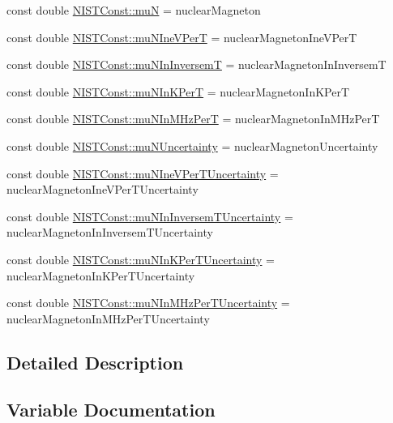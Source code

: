 \begin{DoxyCompactItemize}
\item 
const double \hyperlink{group___nuclear_magneton_ga5b19bcb311479cc6f5c36b551356e580}{N\+I\+S\+T\+Const\+::muN} = nuclear\+Magneton
\item 
const double \hyperlink{group___nuclear_magneton_ga2c8a56a6542df06b37fed3b2b5444ff6}{N\+I\+S\+T\+Const\+::mu\+N\+Ine\+V\+PerT} = nuclear\+Magneton\+Ine\+V\+PerT
\item 
const double \hyperlink{group___nuclear_magneton_ga9c4499c279614bf4bb837c9c4c74b208}{N\+I\+S\+T\+Const\+::mu\+N\+In\+InversemT} = nuclear\+Magneton\+In\+InversemT
\item 
const double \hyperlink{group___nuclear_magneton_gaca6a801a34347be9fd04e7882187484c}{N\+I\+S\+T\+Const\+::mu\+N\+In\+K\+PerT} = nuclear\+Magneton\+In\+K\+PerT
\item 
const double \hyperlink{group___nuclear_magneton_ga4c2e37b42112c282a0dc5969f351187e}{N\+I\+S\+T\+Const\+::mu\+N\+In\+M\+Hz\+PerT} = nuclear\+Magneton\+In\+M\+Hz\+PerT
\item 
const double \hyperlink{group___nuclear_magneton_gabe781a9d8e34ad9a0901188db9784416}{N\+I\+S\+T\+Const\+::mu\+N\+Uncertainty} = nuclear\+Magneton\+Uncertainty
\item 
const double \hyperlink{group___nuclear_magneton_ga9dc78b16dc28b0355f5b8c71b5d7f25c}{N\+I\+S\+T\+Const\+::mu\+N\+Ine\+V\+Per\+T\+Uncertainty} = nuclear\+Magneton\+Ine\+V\+Per\+T\+Uncertainty
\item 
const double \hyperlink{group___nuclear_magneton_ga863b9f210eb86d33267fcb9b38b24082}{N\+I\+S\+T\+Const\+::mu\+N\+In\+Inversem\+T\+Uncertainty} = nuclear\+Magneton\+In\+Inversem\+T\+Uncertainty
\item 
const double \hyperlink{group___nuclear_magneton_ga235e592dc664f715a256c4ee49410486}{N\+I\+S\+T\+Const\+::mu\+N\+In\+K\+Per\+T\+Uncertainty} = nuclear\+Magneton\+In\+K\+Per\+T\+Uncertainty
\item 
const double \hyperlink{group___nuclear_magneton_ga5b70d81fc8665de09e33dc709a91e7f9}{N\+I\+S\+T\+Const\+::mu\+N\+In\+M\+Hz\+Per\+T\+Uncertainty} = nuclear\+Magneton\+In\+M\+Hz\+Per\+T\+Uncertainty
\end{DoxyCompactItemize}


\subsection{Detailed Description}


\subsection{Variable Documentation}
\mbox{\label{group___nuclear_magneton_ga5b19bcb311479cc6f5c36b551356e580}} 
